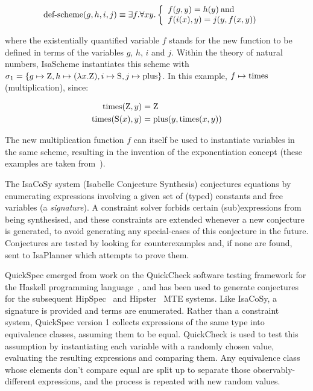 \[
\text{def-scheme}(g,h,i,j) \equiv\\
  \exists f. \forall x y. \left\{
  \begin{array}{l l}
    f(g,y) = h (y)  \: \text{and}  & \\
    f(i(x),y) = j(y,f(x,y)) & \\
  \end{array} \right.
\]

where the existentially quantified variable $f$ stands for the new
function to be defined in terms of the variables $g$, $h$, $i$ and $j$. Within
the theory of natural numbers, IsaScheme instantiates this scheme with
$\sigma_1 = \{g \mapsto \text{Z}, h \mapsto (\lambda x.\text{Z}), i \mapsto \text{S}, j
\mapsto \text{plus}\}$. In this example, $f \mapsto \text{times}$ (multiplication), since:

\begin{align*}
\text{times}(\text{Z}, y)  &= \text{Z} \\
\text{times}(\text{S}(x), y) &= \text{plus}(y, \text{times}(x, y))
\end{align*}

The new multiplication function $f$ can itself be used to instantiate
variables in the same scheme, resulting in the invention of the
exponentiation concept (these examples are taken from~\cite{MontanoRivas2011}).

The IsaCoSy system (Isabelle Conjecture Synthesis) conjectures equations by
enumerating expressions involving a given set of (typed) constants and free
variables (a \emph{signature}). A constraint solver forbids certain
(sub)expressions from being synthesised, and these constraints are extended
whenever a new conjecture is generated, to avoid generating any special-cases of
this conjecture in the future. Conjectures are tested by looking for
counterexamples and, if none are found, sent to IsaPlanner which attempts to
prove them.

QuickSpec emerged from work on the QuickCheck software testing framework for the
Haskell programming language~\cite{claessen2011quickcheck}, and has been used to
generate conjectures for the subsequent
HipSpec~\cite{Claessen_hipspec:automating} and Hipster~\cite{Hipster} MTE
systems. Like IsaCoSy, a signature is provided and terms are enumerated. Rather
than a constraint system, QuickSpec version 1 collects expressions of the same
type into equivalence classes, assuming them to be equal. QuickCheck is used to
test this assumption by instantiating each variable with a randomly chosen
value, evaluating the resulting expressions and comparing them. Any equivalence
class whose elements don't compare equal are split up to separate those
observably-different expressions, and the process is repeated with new random
values.

